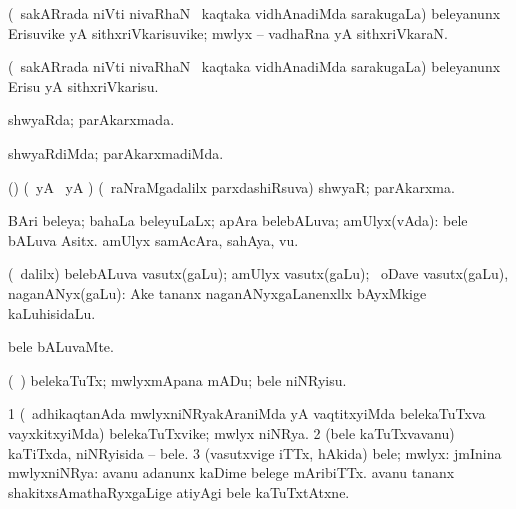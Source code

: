 \bentry
{} 
\gl{\sakirx}
\expl{}
\bmng
\emng
\eentry

\bentry
{} 
\gl{\nA}
\expl{}
\bmng
 (\kanmu\ sakARrada niVti nivaRhaN \mo\ kaqtaka vidhAnadiMda sarakugaLa) beleyanunx Erisuvike yA sithxriVkarisuvike; mwlyx -- vadhaRna yA sithxriVkaraN. 
\emng
\eentry

\bentry
{} 
\gl{\sakirx}
\expl{}
\bmng
 (\kanmu\ sakARrada niVti nivaRhaN \mo\ kaqtaka vidhAnadiMda sarakugaLa) beleyanunx Erisu yA sithxriVkarisu. 
\emng
\eentry

\bentry
{} 
\gl{\gu}
\expl{}
\bmng
shwyaRda; parAkarxmada. 
\emng
\eentry

\bentry
{} 
\gl{\kirxvi}
\expl{}
\bmng
 shwyaRdiMda; parAkarxmadiMda. 
\emng
\eentry

\bentry
{} 
\gl{\nA}
\expl{}
\bmng
 (\birx) (\kAparx\ yA \hA\ yA \aupa) (\kanmu\ raNraMgadalilx parxdashiRsuva) shwyaR; parAkarxma. 
\emng
\eentry

\bentry
{} 
\gl{\nA}
\expl{}
\bmng
{} 
\emng
\eentry

\bentry
{} 
\gl{\gu}
\expl{}
\bmng
 BAri beleya; bahaLa beleyuLaLx; apAra belebALuva; amUlyx(vAda):  bele bALuva Asitx.  amUlyx samAcAra, sahAya, \mo vu. 
\emng
\eentry

\bentry
{} 
\gl{\nA}
\expl{}
\bmng
 (\sA\ \bava dalilx) belebALuva vasutx(gaLu); amUlyx vasutx(gaLu); \kanmu\ oDave vasutx(gaLu), naganANyx(gaLu):  Ake tananx naganANyxgaLanenxllx bAyxMkige kaLuhisidaLu. 
\emng
\eentry

\bentry
{} 
\gl{\kirxvi}
\expl{}
\bmng
 bele bALuvaMte. 
\emng
\eentry

\bentry
{} 
\gl{\akirx}
\expl{}
\bmng
 (\kanmu\ \ame) belekaTuTx; mwlyxmApana mADu; bele niNRyisu. 
\emng
\eentry

\bentry
{} 
\gl{\nA}
\expl{}
\bmng
\bnum
\num{1} (\kanmu\ adhikaqtanAda mwlyxniNRyakAraniMda yA vaqtitxyiMda belekaTuTxva vayxkitxyiMda) belekaTuTxvike; mwlyx niNRya. 
\num{2} (bele kaTuTxvavanu) kaTiTxda, niNRyisida -- bele. 
\num{3} (vasutxvige iTTx, hAkida) bele; mwlyx:  jmInina mwlyxniNRya:  avanu adanunx kaDime belege mAribiTTx.  avanu tananx shakitxsAmathaRyxgaLige atiyAgi bele kaTuTxtAtxne. 
\enum
\emng
\eentry

